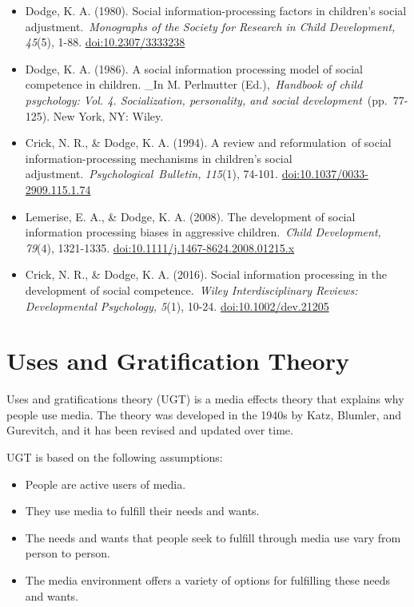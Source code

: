 \documentclass[
  b5paper]{book}
\begin{document}
\begin{itemize}
\item
  Dodge, K. A. (1980). Social information-processing factors in children's social adjustment.~\emph{Monographs of the Society for Research in Child Development, 45}(5), 1-88. \url{doi:10.2307/3333238}
\item
  Dodge, K. A. (1986). A social information processing model of social competence in children. \_In M. Perlmutter (Ed.),~\emph{Handbook of child psychology: Vol. 4. Socialization, personality, and social development}~(pp.~77-125). New York, NY: Wiley.
\item
  Crick, N. R., \& Dodge, K. A. (1994). A review and reformulation~of social information-processing mechanisms in children's social adjustment.~\emph{Psychological~Bulletin, 115}(1), 74-101. \url{doi:10.1037/0033-2909.115.1.74}
\item
  Lemerise, E. A., \& Dodge, K. A. (2008). The development of social information processing biases in aggressive children.~\emph{Child Development, 79}(4), 1321-1335. \url{doi:10.1111/j.1467-8624.2008.01215.x}
\item
  Crick, N. R., \& Dodge, K. A. (2016). Social information processing in the development of social competence.~\emph{Wiley Interdisciplinary Reviews: Developmental Psychology, 5}(1), 10-24. \url{doi:10.1002/dev.21205}
\end{itemize}

\hypertarget{uses-and-gratification-theory}{%
\section{Uses and Gratification Theory}\label{uses-and-gratification-theory}}

Uses and gratifications theory (UGT) is a media effects theory that explains why people use media. The theory was developed in the 1940s by Katz, Blumler, and Gurevitch, and it has been revised and updated over time.

UGT is based on the following assumptions:

\begin{itemize}
\item
  People are active users of media.
\item
  They use media to fulfill their needs and wants.
\item
  The needs and wants that people seek to fulfill through media use vary from person to person.
\item
  The media environment offers a variety of options for fulfilling these needs and wants.
\end{itemize}
\end{document}
